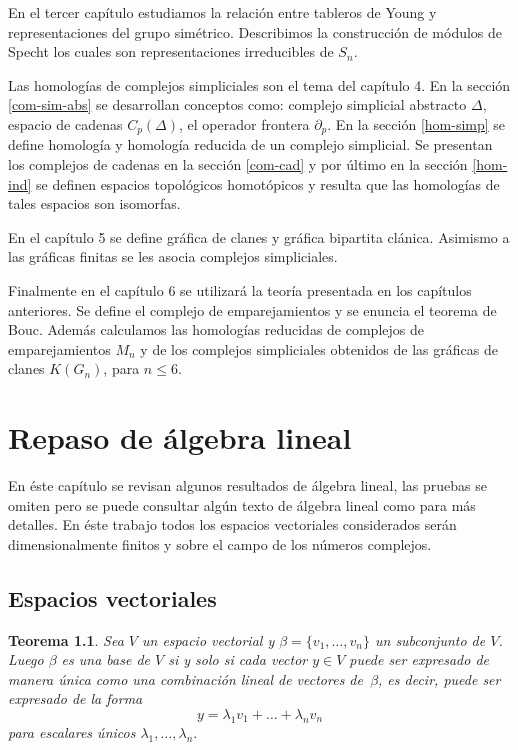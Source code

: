 \documentclass[12pt]{book}
\newtheorem{theorem}{Teorema}[section]
\theoremstyle{definition}
\newcounter{in}
\newcounter{ini}
\begin{document}
En el tercer capítulo estudiamos la relación entre tableros de Young
y representaciones del grupo simétrico. Describimos la construcción de
módulos de Specht los cuales son representaciones irreducibles de
$S_{n}$.

Las homologías de complejos simpliciales son el tema del capítulo 4.
En la sección \ref{com-sim-abs} se desarrollan conceptos como:
complejo simplicial abstracto $\Delta$, espacio de cadenas $C_{p}(\Delta)$, el
operador frontera $\partial_{p}$. En la sección \ref{hom-simp} se
define homología  y homología reducida de un complejo simplicial. Se
presentan los complejos de cadenas en la sección \ref{com-cad} y por
último en la sección \ref{hom-ind} se definen espacios topológicos
homotópicos y resulta que las homologías de tales espacios son
isomorfas.

En el capítulo 5 se define gráfica de clanes y gráfica
bipartita clánica. Asimismo a las gráficas finitas se les asocia complejos
simpliciales.

Finalmente en el capítulo 6 se utilizará la teoría presentada en los
capítulos anteriores. Se define el complejo de emparejamientos y se
enuncia el teorema de Bouc.  Además calculamos las homologías
reducidas de complejos de emparejamientos $M_{n}$ y de los complejos
simpliciales obtenidos de las gráficas de clanes $K(G_{n})$, para
$n\leq 6$.

\tableofcontents


 \newpage \thispagestyle{empty}

\chapter{Repaso de álgebra lineal}
\label{cha:repaso-algebra-lineal}

En éste capítulo se revisan algunos resultados de álgebra lineal, las
pruebas se omiten pero se puede consultar algún texto de álgebra
lineal como \cite{friedberg1982algebra}
para más  detalles. En éste trabajo todos los espacios vectoriales
considerados serán dimensionalmente finitos y sobre el campo de los
números complejos.

\section{Espacios vectoriales}
\label{esp-vec}

\begin{theorem}
  \label{clunica}
  Sea $V$ un espacio vectorial y $\beta=\{v_{1},\dots,v_{n}\}$ un
  subconjunto de $V$. Luego $\beta$ es una base de $V$ si y solo si
  cada vector $y\in V$ puede ser expresado de manera única como una
  combinación lineal de vectores de~$\beta$, es decir, puede ser
  expresado de la forma
  $$y=\lambda_{1}v_{1}+\ldots+\lambda_{n}v_{n}$$
  para escalares únicos $\lambda_{1},\ldots,\lambda_{n}.$
\end{theorem}
\end{document}
